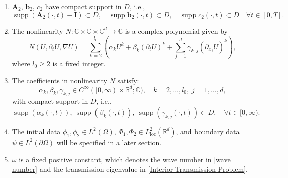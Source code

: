 \documentclass[11pt,reqno,oneside]{amsart}
\numberwithin{equation}{section}
\theoremstyle{definition}
\theoremstyle{remark}
\numberwithin{equation}{section}
\begin{document}
\begin{enumerate}
\begin{enumerate}
			\item $\overline{\xi}^{\top} \mathbf{A}_2(\mathbf{x},t) \xi \geq \theta \lvert \xi \rvert^{2}$ for all $(\mathbf{x},t) \in \mathbb{R}^d \times [0,T]$, $\forall \xi \in \mathbb{C}^d$, with constant $\theta > 0$;
			
			\item $\mathbf{A}_2\in {W^{1,\infty}\left(0,T; W^{3,\infty}(\mathbb{R}^d)\right)}$;
			
			\item $\mathbf{b}_2, c_2 \in L^{\infty}\big(0,T; W^{2,\infty}(\mathbb{R}^d)\big)$.
		\end{enumerate}
		
		\item $\mathbf{A}_2$, $\mathbf{b}_2$, $c_2$ have compact support in $D$, i.e.,
		\begin{equation*}\label{compact support2}
			\operatorname{supp}(\mathbf{A}_2(\cdot,t) - \mathbf{I}) \subset D,\quad
			\operatorname{supp} \mathbf{b}_2(\cdot,t) \subset D,\quad
			\operatorname{supp} c_2(\cdot,t) \subset D \quad \forall t \in [0,T].
		\end{equation*}
		
		\item The nonlinearity $N: \mathbb{C} \times  \mathbb{C} \times  \mathbb{C}^{d}\to \mathbb{C}$ is a complex polynomial given by
		\begin{equation}
			N(U,\partial_{t} U,\nabla U) =\sum_{k=2}^{l_{0}} \left( \alpha_k U^k + \beta_k ({\partial_t U})^k + \sum_{j=1}^d \gamma_{k,j} (\partial_{x_j} U)^k \right),
			\label{eq:nonlinearity}
		\end{equation}
		where $l_0 \geq 2$ is a fixed integer.
		
		\item The coefficients in nonlinearity $N$ satisfy$:$
		\[
		\alpha_k, \beta_k, \gamma_{k,j} \in C^{\infty}([0,\infty)\times \mathbb{R}^d;\mathbb{C}), \quad k=2,\dots,l_0,\ j=1,\dots,d,
		\]
		with compact support in $D$, i.e.,
		\[
		\operatorname{supp}(\alpha_k(\cdot,t)),\ \operatorname{supp}(\beta_k(\cdot,t)),\ \operatorname{supp}(\gamma_{k,j}(\cdot,t)) \subset D, \quad \forall t\in[0,\infty).
		\]
		
		\item The initial data $\phi_1,\phi_2\in L^2{(\Omega)}$, $\Phi_1,\Phi_2 \in L^{2}_{\mathrm{loc}}(\mathbb{R}^d)$, and boundary data $\psi \in L^{2}(\partial \Omega)$ will be specified in a later section.
		
		\item $\omega$ is a fixed positive constant, which denotes the wave number in \eqref{wave number} and the transmission eigenvalue in \eqref{Interior Transmission Problem}.
	\end{enumerate}
	
\end{document}
